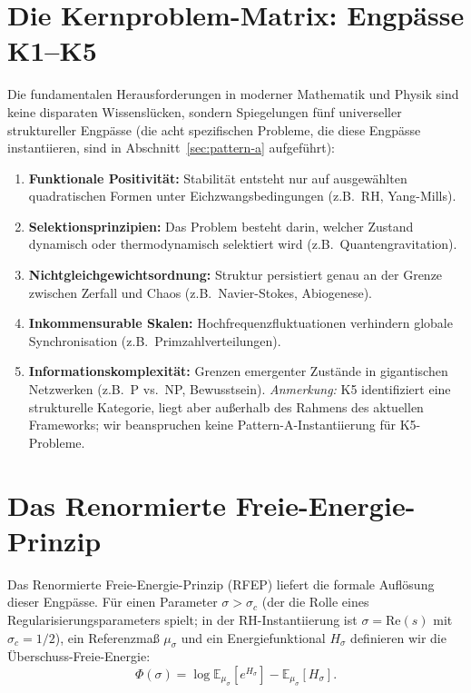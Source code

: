 \documentclass[12pt,a4paper]{article}
\theoremstyle{definition}
\theoremstyle{remark}
\newcommand{\EE}{\mathbb{E}}
\begin{document}
\section{Die Kernproblem-Matrix: Engpässe K1--K5}

Die fundamentalen Herausforderungen in moderner Mathematik und Physik sind keine disparaten Wissenslücken, sondern Spiegelungen fünf universeller struktureller Engpässe (die acht spezifischen Probleme, die diese Engpässe instantiieren, sind in Abschnitt~\ref{sec:pattern-a} aufgeführt):
\begin{enumerate}[label=\textbf{K\arabic*:}, leftmargin=3.5em]
    \item \textbf{Funktionale Positivität:} Stabilität entsteht nur auf ausgewählten quadratischen Formen unter Eichzwangsbedingungen (z.B.\ RH, Yang-Mills).
    \item \textbf{Selektionsprinzipien:} Das Problem besteht darin, welcher Zustand dynamisch oder thermodynamisch selektiert wird (z.B.\ Quantengravitation).
    \item \textbf{Nichtgleichgewichtsordnung:} Struktur persistiert genau an der Grenze zwischen Zerfall und Chaos (z.B.\ Navier-Stokes, Abiogenese).
    \item \textbf{Inkommensurable Skalen:} Hochfrequenzfluktuationen verhindern globale Synchronisation (z.B.\ Primzahlverteilungen).
    \item \textbf{Informationskomplexität:} Grenzen emergenter Zustände in gigantischen Netzwerken (z.B.\ P vs.\ NP, Bewusstsein). \emph{Anmerkung:} K5 identifiziert eine strukturelle Kategorie, liegt aber außerhalb des Rahmens des aktuellen Frameworks; wir beanspruchen keine Pattern-A-Instantiierung für K5-Probleme.
\end{enumerate}

\section{Das Renormierte Freie-Energie-Prinzip}

Das Renormierte Freie-Energie-Prinzip (RFEP) liefert die formale Auflösung dieser Engpässe. Für einen Parameter $\sigma > \sigma_c$ (der die Rolle eines Regularisierungsparameters spielt; in der RH-Instantiierung ist $\sigma = \mathrm{Re}(s)$ mit $\sigma_c = 1/2$), ein Referenzmaß $\mu_\sigma$ und ein Energiefunktional $H_\sigma$ definieren wir die Überschuss-Freie-Energie:
\begin{equation}\label{eq:rfep}
    \Phi(\sigma) = \log \EE_{\mu_\sigma}[e^{H_\sigma}] - \EE_{\mu_\sigma}[H_\sigma].
\end{equation}
\end{document}
